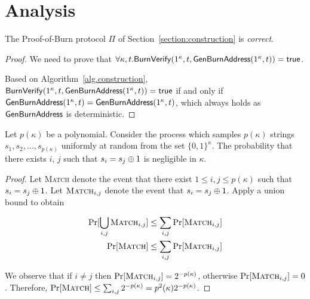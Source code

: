 \section{Analysis}

\begin{theorem}[Correctness]
  The Proof-of-Burn protocol $\Pi$ of Section~\ref{section:construction} is \emph{correct}.
\end{theorem}
\begin{proof}
  We need to prove that $\forall \kappa, t. \mathsf{BurnVerify}(1^\kappa, t, \mathsf{GenBurnAddress}(1^\kappa, t)) = \textsf{true}$.

  Based on Algorithm~\ref{alg.construction}, $\mathsf{BurnVerify}(1^\kappa, t, \mathsf{GenBurnAddress}(1^\kappa, t)) = \textsf{true}$ if and only if $\mathsf{GenBurnAddress}(1^\kappa, t) = \mathsf{GenBurnAddress}(1^\kappa, t)$, which always holds as $\mathsf{GenBurnAddress}$ is deterministic.
\end{proof}

\begin{lemma}[Perturbation]
  \label{lem.perturbation}
  Let $p(\kappa)$ be a polynomial. Consider the process which samples $p(\kappa)$ strings $s_1, s_2, \dots, s_{p(\kappa)}$ uniformly at random from the set $\{0, 1\}^\kappa$. The probability that there exists $i$, $j$ such that $s_i = s_j \oplus 1$ is negligible in $\kappa$.
\end{lemma}
\begin{proof}
  Let \textsc{Match} denote the event that there exist $1 \leq i, j \leq p(\kappa)$ such that $s_i = s_j \oplus 1$.
  Let $\textsc{Match}_{i, j}$ denote the event that $s_i = s_j \oplus 1$. Apply a union bound to obtain

  \begin{align*}
    \Pr[\bigcup_{i, j}\textsc{Match}_{i, j}] &\leq \sum_{i, j} \Pr[\textsc{Match}_{i, j}] \\
    \Pr[\textsc{Match}] &\leq \sum_{i, j} \Pr[\textsc{Match}_{i, j}]
  \end{align*}

  We observe that if $i \neq j$ then $\Pr[\textsc{Match}_{i, j}] = 2^{-p(\kappa)}$, otherwise $\Pr[\textsc{Match}_{i, j}] = 0$. Therefore, $\Pr[\textsc{Match}] \leq \sum_{i, j} 2^{-p(\kappa)} = p^2(\kappa) 2^{-p(\kappa)}$.
\end{proof}

